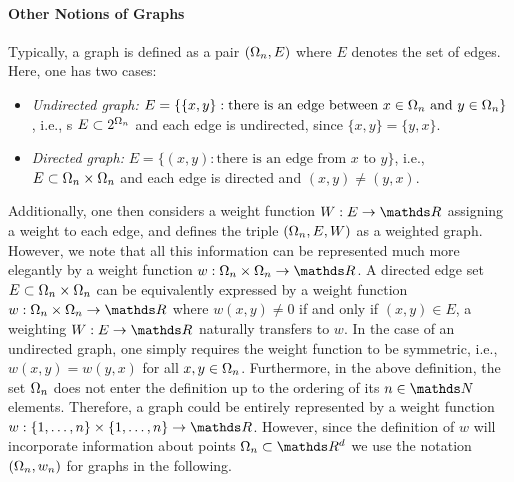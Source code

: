\paragraph{Other Notions of Graphs}
Typically, a graph is defined as a pair $(\Omega_n,E)$ where $E$ denotes the set of edges. Here, 
one has two cases:
\begin{itemize}
\item \emph{Undirected graph:} $E=\{ \{x,y\}: \text{there is an edge between } x\in \Omega_n \text{ and } y\in \Omega_n\}$, i.e., s
$E\subset 2^{\Omega_n}$ and each edge is undirected, since $\{x,y\}=\{y,x\}$.
%
\item \emph{Directed graph:} $E=\{ (x,y): \text{there is an edge from } x \text{ to } y\}$, i.e.,
$E\subset \Omega_n\times \Omega_n$ and each edge is directed and $(x,y)\neq(y,x)$.
%
\end{itemize}
Additionally, one then considers a weight function $W:E\to\R$ assigning a weight to each edge, and defines 
the triple $(\Omega_n,E,W)$ as a weighted graph. However, we note that all this information can be represented much more elegantly by a weight function $w:\domain_n\times \domain_n\to\R$. A directed edge set $E\subset \Omega_n\times \Omega_n$ can be equivalently expressed by 
a weight function $w:\domain_n\times \domain_n\to\R$ where $w(x,y)\neq 0$ if and only if $(x,y)\in E$, a weighting $W:E\to\R$ 
naturally transfers to $w$. In the case of an undirected graph, one simply requires the weight function to be symmetric, i.e., 
$w(x,y)=w(y,x)$ for all $x,y\in \Omega_n$.
%
Furthermore, in the above definition, the set $\Omega_n$ does not enter the definition up to the  ordering of its $n\in \N$  elements. Therefore, a graph could be entirely represented by a weight function $w:\{1,\ldots,n\}\times\{1,\ldots,n\}\to\R$. However, since the definition of $w$ will incorporate information about points $\domain_n\subset\R^d$ we use the notation $(\Omega_n, w_n)$ for graphs in the following.
%
%
%
